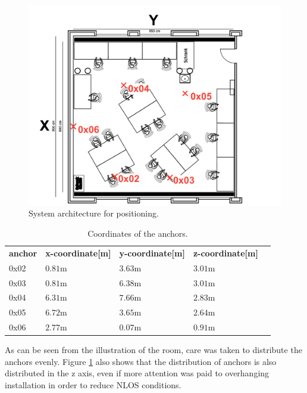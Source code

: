 \documentclass[conference, a4paper]{IEEEtran}
\begin{document}

\begin{figure}[hbt!]
	\centering
	\includegraphics[scale=0.3]{pic/anchor_position.pdf}
	\caption{System architecture for positioning.}
	\label{fig:systemarch}
\end{figure}

\begin{table}[hbt!]
	\centering
	\begin{tabular}{l l l l c}
		\textbf{anchor} & \textbf{x-coordinate[m]} & \textbf{y-coordinate[m]} & \textbf{z-coordinate[m]}\\
		0x02 & $0.81$m & $3.63$m & $3.01$m\\
		0x03 & $0.81$m & $6.38$m & $3.01$m\\
		0x04 & $6.31$m & $7.66$m & $2.83$m\\
		0x05 & $6.72$m & $3.65$m & $2.64$m\\
		0x06 & $2.77$m & $0.07$m & $0.91$m\\
		
	\end{tabular}
	\caption{Coordinates of the anchors.}
	\label{table:anchor_positions}
\end{table}

As can be seen from the illustration of the room, care was taken to distribute the anchors evenly.
Figure \ref{fig:systemarch} also shows that the distribution of anchors is also distributed in the z axis, even if more attention was paid to overhanging installation in order to reduce \ac{NLOS} conditions.
\end{document}
